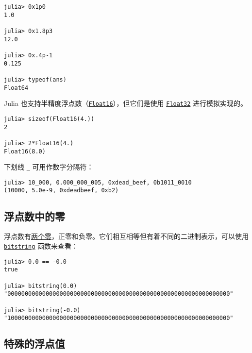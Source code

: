 \begin{verbatim}
julia> 0x1p0
1.0

julia> 0x1.8p3
12.0

julia> 0x.4p-1
0.125

julia> typeof(ans)
Float64
\end{verbatim}



Julia 也支持半精度浮点数（\hyperlink{2727296760866702904}{\texttt{Float16}}），但它们是使用 \hyperlink{8101639384272933082}{\texttt{Float32}} 进行模拟实现的。




\begin{verbatim}
julia> sizeof(Float16(4.))
2

julia> 2*Float16(4.)
Float16(8.0)
\end{verbatim}



下划线 \texttt{\_} 可用作数字分隔符：




\begin{verbatim}
julia> 10_000, 0.000_000_005, 0xdead_beef, 0b1011_0010
(10000, 5.0e-9, 0xdeadbeef, 0xb2)
\end{verbatim}



\hypertarget{3917895508430327726}{}


\subsection{浮点数中的零}



浮点数有\href{https://zh.wikipedia.org/wiki/\%E2\%88\%920}{两个零}，正零和负零。它们相互相等但有着不同的二进制表示，可以使用 \hyperlink{9171163989026657457}{\texttt{bitstring}} 函数来查看：




\begin{verbatim}
julia> 0.0 == -0.0
true

julia> bitstring(0.0)
"0000000000000000000000000000000000000000000000000000000000000000"

julia> bitstring(-0.0)
"1000000000000000000000000000000000000000000000000000000000000000"
\end{verbatim}



\hypertarget{16626704755049875766}{}


\subsection{特殊的浮点值}



